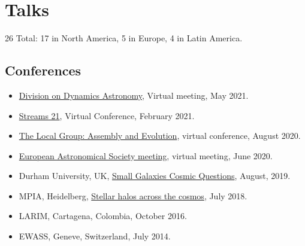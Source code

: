 \documentclass[UTF8]{article}
\begin{document}
\section*{Talks}

26 Total: 17 in North America, 5 in Europe, 4 in Latin America.

\subsection*{Conferences}

\begin{itemize}
  \setlength\itemsep{0.0em}
  \renewcommand\labelitemi{$\cdot$}


\item \href{https://aas.org/meetings/dda52}{Division on Dynamics Astronomy}, Virtual meeting, May 2021.
\item \href{https://stellarstreams.org/streams21/}{Streams 21}, Virtual
  Conference, February 2021. 
\item  \href{https://www.stsci.edu/contents/events/stsci/2020/april/the-local-group-assembly-and-evolution?page=2&filterUUID=6fedb8a7-}{The Local Group: Assembly and Evolution}, virtual conference, August 2020.
\item \href{https://eas.unige.ch/EAS2020/}{European Astronomical Society meeting}, virtual meeting, June 2020.
\item Durham University, UK, \href{http://astro.dur.ac.uk/cosmodwarfs/}{Small Galaxies Cosmic Questions}, August, 2019.
\item MPIA, Heidelberg, \href{http://www.mpia.de/homes/stellarhalos2018-loc/sh2018/index.html}{Stellar halos across the cosmos}, July 2018.
\item LARIM, Cartagena, Colombia, October 2016.
\item EWASS, Geneve, Switzerland, July 2014.
\end{itemize}
  
\end{document}

